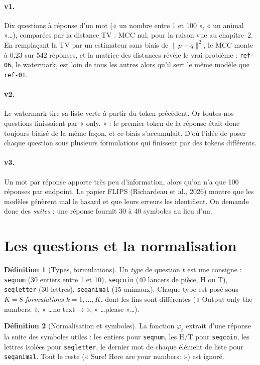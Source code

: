 \documentclass[11pt,a4paper]{report}
\theoremstyle{definition}
\newtheorem{definition}{Définition}[chapter]
\theoremstyle{plain}
\newcommand{\code}[1]{\texttt{#1}}
\begin{document}
\paragraph{v1.} Dix questions à réponse d'un mot (« un nombre entre 1 et 100 », « un animal »…), comparées par la distance TV : MCC nul, pour la raison vue au chapitre~2. En remplaçant la TV par un estimateur sans biais de $\|p-q\|^2$, le MCC monte à 0,23 sur 542 réponses, et la matrice des distances révèle le vrai problème : \code{ref-06}, le watermark, est loin de tous les autres alors qu'il sert le même modèle que \code{ref-01}.

\paragraph{v2.} Le watermark tire sa liste verte à partir du token précédent. Or toutes nos questions finissaient par « only. » : le premier token de la réponse était donc toujours biaisé de la même façon, et ce biais s'accumulait. D'où l'idée de poser chaque question sous plusieurs formulations qui finissent par des tokens différents.

\paragraph{v3.} Un mot par réponse apporte très peu d'information, alors qu'on n'a que 100 réponses par endpoint. Le papier FLIPS (Richardeau et al., 2026) montre que les modèles génèrent mal le hasard et que leurs erreurs les identifient. On demande donc des \emph{suites} : une réponse fournit 30 à 40 symboles au lieu d'un.

\section{Les questions et la normalisation}

\begin{definition}[Types, formulations]
Un \emph{type} de question $t$ est une consigne : \code{seqnum} (30 entiers entre 1 et 10), \code{seqcoin} (40 lancers de pièce, H ou T), \code{seqletter} (30 lettres), \code{seqanimal} (15 animaux). Chaque type est posé sous $K=8$ \emph{formulations} $k=1,\dots,K$, dont les fins sont différentes (« Output only the numbers. », « …no text → », « …please »…).
\end{definition}

\begin{definition}[Normalisation et symboles]
La fonction $\varphi_t$ extrait d'une réponse la suite des symboles utiles : les entiers pour \code{seqnum}, les H/T pour \code{seqcoin}, les lettres isolées pour \code{seqletter}, le dernier mot de chaque élément de liste pour \code{seqanimal}. Tout le reste (« Sure! Here are your numbers: ») est ignoré.
\end{definition}
\end{document}
